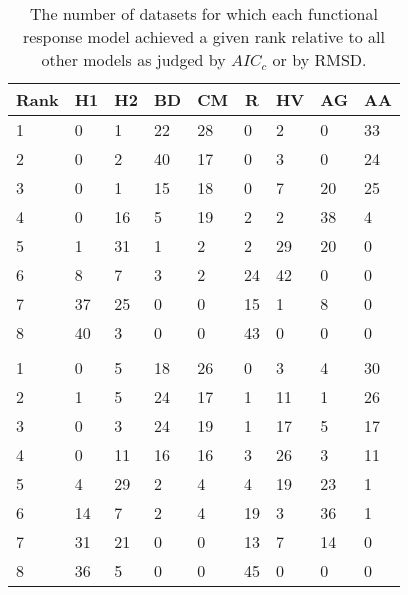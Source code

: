 \begin{table}[!tbp]
\caption{The number of datasets for which each functional response model achieved a given rank relative to all other models as judged by $AIC_c$ or by RMSD.\label{table:AICc_and_RMSD_rankings}} 
\begin{center}
\begin{tabular}{lllllllll}
\hline\hline
\multicolumn{1}{l}{Rank}&\multicolumn{1}{c}{H1}&\multicolumn{1}{c}{H2}&\multicolumn{1}{c}{BD}&\multicolumn{1}{c}{CM}&\multicolumn{1}{c}{R}&\multicolumn{1}{c}{HV}&\multicolumn{1}{c}{AG}&\multicolumn{1}{c}{AA}\tabularnewline
\hline
1&0&1&22&28&0&2&0&33\tabularnewline
2&0&2&40&17&0&3&0&24\tabularnewline
3&0&1&15&18&0&7&20&25\tabularnewline
4&0&16&5&19&2&2&38&4\tabularnewline
5&1&31&1&2&2&29&20&0\tabularnewline
6&8&7&3&2&24&42&0&0\tabularnewline
7&37&25&0&0&15&1&8&0\tabularnewline
8&40&3&0&0&43&0&0&0\tabularnewline
&&&&&&&&\tabularnewline
1&0&5&18&26&0&3&4&30\tabularnewline
2&1&5&24&17&1&11&1&26\tabularnewline
3&0&3&24&19&1&17&5&17\tabularnewline
4&0&11&16&16&3&26&3&11\tabularnewline
5&4&29&2&4&4&19&23&1\tabularnewline
6&14&7&2&4&19&3&36&1\tabularnewline
7&31&21&0&0&13&7&14&0\tabularnewline
8&36&5&0&0&45&0&0&0\tabularnewline
\hline
\end{tabular}\end{center}
\end{table}
